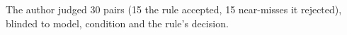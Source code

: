 The author judged 30 pairs (15 the rule accepted, 15 near-misses it rejected), blinded to model, condition and the rule's decision.%
